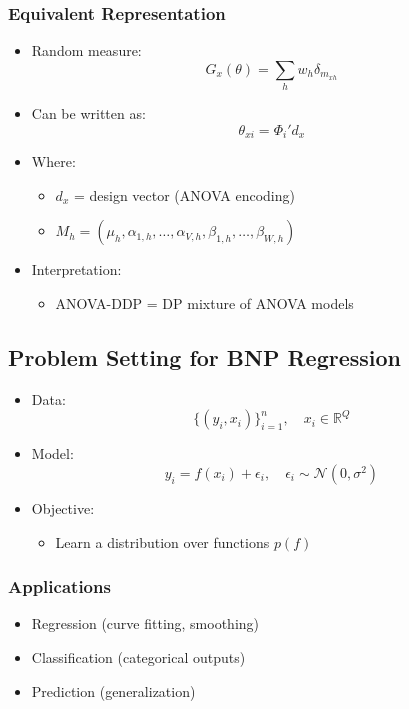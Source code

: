 \documentclass[12pt,oneside]{book}
\numberwithin{equation}{section}
\theoremstyle{definition}
\theoremstyle{plain}
\theoremstyle{remark}
\begin{document}
\subsubsection*{Equivalent Representation}
\begin{itemize}
\item Random measure:
\[
G_x(\theta) = \sum_h w_h \delta_{m_{xh}}
\]

\item Can be written as:
\[
\theta_{xi} = \Phi_i' d_x
\]

\item Where:
\begin{itemize}
\item $d_x$ = design vector (ANOVA encoding)
\item $M_h = (\mu_h, \alpha_{1,h}, \ldots, \alpha_{V,h}, \beta_{1,h}, \ldots, \beta_{W,h})$
\end{itemize}

\item Interpretation:
\begin{itemize}
\item ANOVA-DDP = DP mixture of ANOVA models
\end{itemize}
\end{itemize}

\subsection{Problem Setting for BNP Regression}

\begin{itemize}
\item Data:
\[
\{(y_i, x_i)\}_{i=1}^n, \quad x_i \in \mathbb{R}^Q
\]

\item Model:
\[
y_i = f(x_i) + \epsilon_i, \quad \epsilon_i \sim \mathcal{N}(0,\sigma^2)
\]

\item Objective:
\begin{itemize}
\item Learn a distribution over functions $p(f)$
\end{itemize}
\end{itemize}

\subsubsection*{Applications}
\begin{itemize}
\item Regression (curve fitting, smoothing)
\item Classification (categorical outputs)
\item Prediction (generalization)
\end{itemize}
\end{document}
